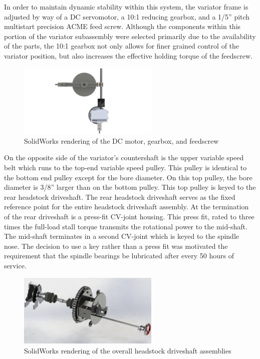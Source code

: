 In order to maintain dynamic stability within this system, the variator frame is adjusted by way of a DC servomotor, a 10:1 reducing gearbox, and a 1/5” pitch multistart precision ACME feed screw. Although the components within this portion of the variator subassembly were selected primarily due to the availability of the parts, the 10:1 gearbox not only allows for finer grained control of the variator position, but also increases the effective holding torque of the feedscrew. 

\begin{figure}[H]
    \centering
    \includegraphics[width=0.6\textwidth]{./images/Chapter2-MachineDescription/DCGF}
    \caption{SolidWorks rendering of the DC motor, gearbox, and feedscrew}
    \label{fig:DCGF}
\end{figure}

On the opposite side of the variator’s countershaft is the upper variable speed belt which runs to the top-end variable speed pulley. This pulley is identical to the bottom end pulley except for the bore diameter. On this top pulley, the bore diameter is 3/8” larger than on the bottom pulley. This top pulley is keyed to the rear headstock driveshaft. The rear headstock driveshaft serves as the fixed reference point for the entire headstock driveshaft assembly. At the termination of the rear driveshaft is a press-fit CV-joint housing. This press fit, rated to three times the full-load stall torque transmits the rotational power to the mid-shaft. The mid-shaft terminates in a second CV-joint which is keyed to the spindle nose. The decision to use a key rather than a press fit was motivated the requirement that the spindle bearings be lubricated after every 50 hours of service. 

\begin{figure}[H]
    \centering
    \includegraphics[width=0.6\textwidth]{./images/Chapter2-MachineDescription/HD}
    \caption{SolidWorks rendering of the overall headstock driveshaft assemblies}
    \label{fig:HD}
\end{figure}

